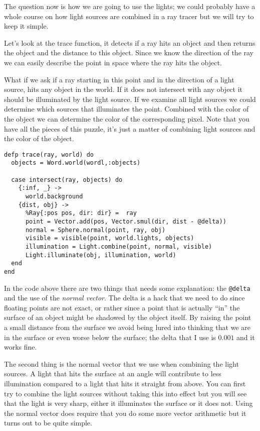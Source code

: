 \documentclass[a4paper,11pt]{article}
\begin{document}
The question now is how we are going to use the lights; we could
probably have a whole course on how light sources are combined in a
ray tracer but we will try to keep it simple. 

Let's look at the trace function, it detects if a ray hits an object
and then returns the object and the distance to this object. Since we
know the direction of the ray we can easily describe the point in
space where the ray hits the object.

What if we ask if a ray starting in this point and in the direction of
a light source, hits any object in the world. If it does not intersect
with any object it should be illuminated by the light source. If we
examine all light sources we could determine which sources that
illuminates the point. Combined with the color of the object we can
determine the color of the corresponding pixel. Note that you
have all the pieces of this puzzle, it's just a matter of combining
light sources and the color of the object.

\pagebreak

\begin{verbatim}
defp trace(ray, world) do
  objects = Word.world(wordl,:objects)

  case intersect(ray, objects) do
    {:inf, _} ->
      world.background
    {dist, obj} ->
      %Ray{:pos pos, dir: dir} =  ray
      point = Vector.add(pos, Vector.smul(dir, dist - @delta))
      normal = Sphere.normal(point, ray, obj)
      visible = visible(point, world.lights, objects)
      illumination = Light.combine(point, normal, visible)
      Light.illuminate(obj, illumination, world)
  end
end
\end{verbatim}

In the code above there are two things that needs some explanation:
the {\tt @delta} and the use of the {\em normal vector}. The delta is
a hack that we need to do since floating points are not exact, or
rather since a point that is actually ``in'' the surface of an object
might be shadowed by the object itself. By raising the point a small
distance from the surface we avoid being lured into thinking that we
are in the surface or even worse below the surface; the delta that I
use is $0.001$ and it works fine.

The second thing is the normal vector that we use when
combining the light sources. A light that hits the surface at an angle
will contribute to less illumination compared to a light that hits it
straight from above. You can first try to combine the light sources
without taking this into effect but you will see that the light is
very sharp, either it illuminates the surface or it does not. Using
the normal vector does require that you do some more vector
arithmetic but it turns out to be quite simple.
\end{document}
